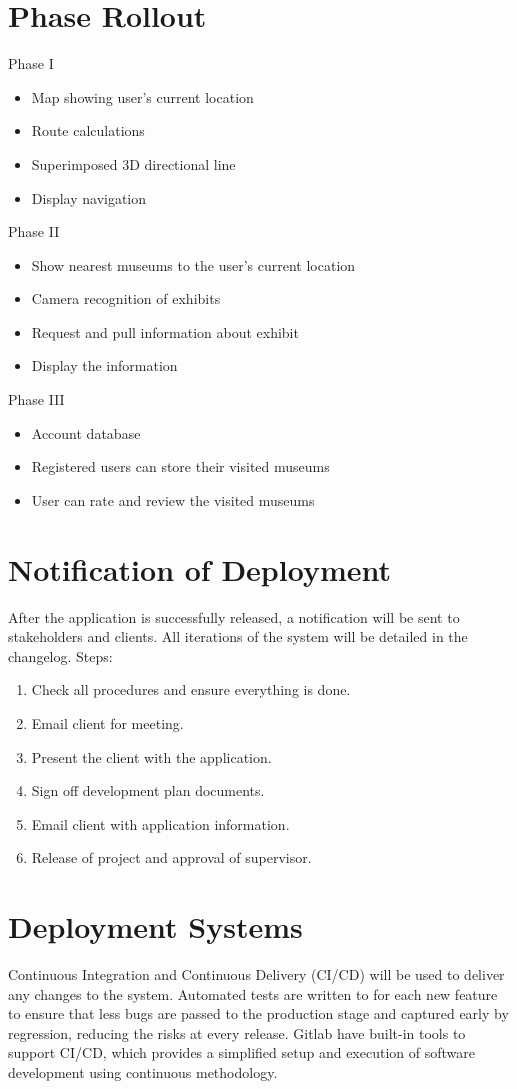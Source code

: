 \documentclass[12pt]{article}
\begin{document}
\section{Phase Rollout}
Phase I
\begin{itemize}
    \item Map showing user's current location
    \item Route calculations
    \item Superimposed 3D directional line
    \item Display navigation
\end{itemize}
Phase II
\begin{itemize}
    \item Show nearest museums to the user's current location
    \item Camera recognition of exhibits
    \item Request and pull information about exhibit
    \item Display the information
\end{itemize}
Phase III
\begin{itemize}
    \item Account database
    \item Registered users can store their visited museums
    \item User can rate and review the visited museums
\end{itemize}

\section{Notification of Deployment}
After the application is successfully released, a notification will be sent to stakeholders and clients. All iterations of the system will be detailed in the changelog.
\newline
Steps:
\begin{enumerate}
    \item Check all procedures and ensure everything is done.
    \item Email client for meeting.
    \item Present the client with the application.
    \item Sign off development plan documents.
    \item Email client with application information.
    \item Release of project and approval of supervisor.
\end{enumerate}

\section{Deployment Systems}
Continuous Integration and Continuous Delivery (CI/CD) will be used to deliver any changes to the system. Automated tests are written to for each new feature to ensure that less bugs are passed to the production stage and captured early by regression, reducing the risks at every release. Gitlab have built-in tools to support CI/CD, which provides a simplified setup and execution of software development using continuous methodology.
\end{document}
